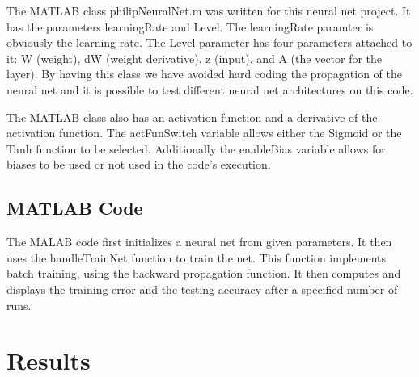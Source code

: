 \documentclass[12pt]{article}
\begin{document}
	The MATLAB class philipNeuralNet.m was written for this neural net project. It has the parameters learningRate and Level. The learningRate paramter is obviously the learning rate. The Level parameter has four parameters attached to it: W (weight), dW (weight derivative),  z (input), and A (the vector for the layer). By having this class we have avoided hard coding the propagation of the neural net and it is possible to test different neural net architectures on this code. \par 
	
	The MATLAB class also has an activation function and a derivative of the activation function. The actFunSwitch variable allows either the Sigmoid or the Tanh function to be selected. Additionally the enableBias variable allows for biases to be used or not used in the code's execution. \par 
	
	\subsection{MATLAB Code}
	The MALAB code first initializes a neural net from given parameters. It then uses the handleTrainNet function to train the net. This function implements batch training, using the backward propagation function. It then computes and displays the training error and the testing accuracy after a specified number of runs. 
	
	
	\section{Results}
\end{document}
